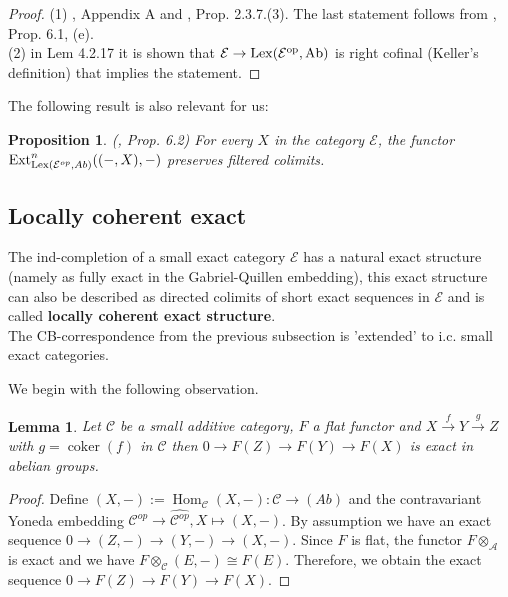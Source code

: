 \documentclass[11pt,a4paper]{amsart}
\theoremstyle{plain}
\newtheorem{lem}[thm]{Lemma}
\newtheorem{pro}[thm]{Proposition}
\theoremstyle{definition}
\DeclareMathOperator{\Hom}{Hom}
\DeclareMathOperator{\Ext}{Ext}
\DeclareMathOperator{\coKer}{coker}
\newcommand{\mcA}{\mathcal{A}}
\newcommand{\mcC}{\mathcal{C}}
\newcommand{\mcE}{\mathcal{E}}
\begin{document}
\begin{proof}
(1) \cite{Bue}, Appendix A and \cite{Kr-book}, Prop. 2.3.7.(3). The last statement follows from \cite{P-locCoh}, Prop. 6.1, (e).\\   
(2) \cite{Kr-book} in Lem 4.2.17 it is shown that $\mcE \to \rm{Lex} (\mcE^{op}, Ab)$ is right cofinal (Keller's definition) that implies the statement. 
\end{proof}




The following result is also relevant for us: 
\begin{pro} (\cite{P-locCoh}, Prop. 6.2) \label{PosExt1}
For every $X$ in the category $\mcE$, the functor \\$\Ext^n_{{\rm Lex} (\mcE^{op}, Ab) }((-,X), - )$ preserves filtered colimits. 
\end{pro}




\subsection{Locally coherent exact}

The ind-completion of a small exact category $\mcE$ has a natural exact structure (namely as fully exact in the Gabriel-Quillen embedding), this exact structure can also be described as directed colimits of short exact sequences in $\mcE$ and is called \textbf{locally coherent exact structure}.\\ 
The CB-correspondence from the previous subsection is 'extended' to i.c. small exact categories. 





We begin with the following observation. 
\begin{lem}
Let $\mcC$ be a small additive category, $F$ a flat functor and  $X\xrightarrow{f} Y \xrightarrow{g} Z$ with $g=\coKer (f)$ in $\mcC$ then $0 \to F(Z) \to F(Y) \to F(X)$ is exact in abelian groups.     
\end{lem}

\begin{proof}
Define $(X, -):=\Hom_{\mcC} (X,-)\colon \mcC \to (Ab)$ and the contravariant Yoneda embedding $\mcC^{op}\to \hat{\mcC^{op}}, X\mapsto (X,-)$. By assumption we have an exact sequence $0 \to (Z,-) \to (Y,-) \to (X, -)$. Since $F$ is flat, the functor $F\otimes_{\mcA}$ is exact and we have $F\otimes_{\mcC} (E,-)\cong F(E)$. Therefore, we obtain the exact sequence $0 \to F(Z) \to F(Y) \to F(X)$.     
\end{proof}
\end{document}
